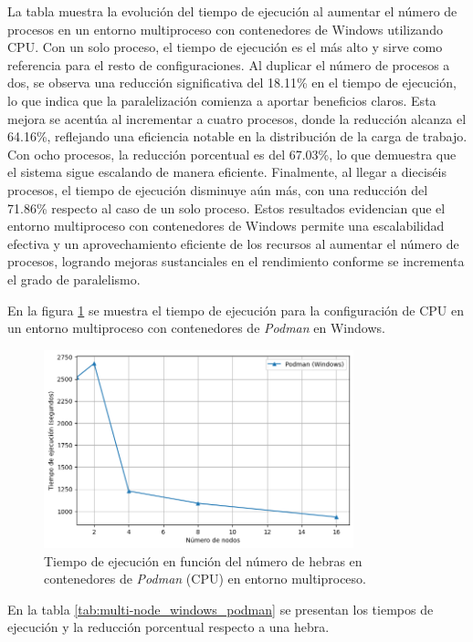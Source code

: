 La tabla muestra la evolución del tiempo de ejecución al aumentar el número de procesos en un entorno multiproceso con contenedores de Windows utilizando CPU. Con un solo proceso, el tiempo de ejecución es el más alto y sirve como referencia para el resto de configuraciones. Al duplicar el número de procesos a dos, se observa una reducción significativa del 18.11\% en el tiempo de ejecución, lo que indica que la paralelización comienza a aportar beneficios claros. Esta mejora se acentúa al incrementar a cuatro procesos, donde la reducción alcanza el 64.16\%, reflejando una eficiencia notable en la distribución de la carga de trabajo. Con ocho procesos, la reducción porcentual es del 67.03\%, lo que demuestra que el sistema sigue escalando de manera eficiente. Finalmente, al llegar a dieciséis procesos, el tiempo de ejecución disminuye aún más, con una reducción del 71.86\% respecto al caso de un solo proceso. Estos resultados evidencian que el entorno multiproceso con contenedores de Windows permite una escalabilidad efectiva y un aprovechamiento eficiente de los recursos al aumentar el número de procesos, logrando mejoras sustanciales en el rendimiento conforme se incrementa el grado de paralelismo.

En la figura \ref{fig:multi-node_windows_podman_time} se muestra el tiempo de ejecución para la configuración de CPU en un entorno multiproceso con contenedores de \textit{Podman} en Windows.

\begin{figure}[ht]
    \centering
    \includegraphics[width=0.8\textwidth]{imagenes/cap5/multi-node_windows_podman_time.png}
    \caption{Tiempo de ejecución en función del número de hebras en contenedores de \textit{Podman} (CPU) en entorno multiproceso.}
    \label{fig:multi-node_windows_podman_time}
\end{figure}

En la tabla \ref{tab:multi-node_windows_podman} se presentan los tiempos de ejecución y la reducción porcentual respecto a una hebra.

